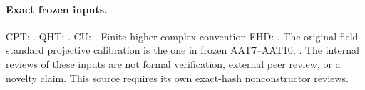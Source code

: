 \paragraph{Exact frozen inputs.}
CPT: .
QHT: .
CU: .
Finite higher-complex convention FHD:
.
The original-field standard projective calibration is the one in
frozen AAT7--AAT10,
.
The internal reviews of these inputs are not formal verification,
external peer review, or a novelty claim.  This source requires its
own exact-hash nonconstructor reviews.
